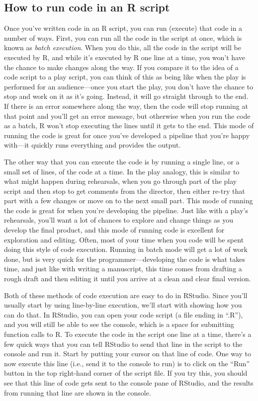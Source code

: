 \documentclass[]{tufte-book}
\begin{document}
\subsection{How to run code in an R script}\label{how-to-run-code-in-an-r-script}

Once you've written code in an R script, you can run (execute) that code in a
number of ways. First, you can run all the code in the script at once, which is
known as \emph{batch execution}. When you do this, all the code in the script will be
executed by R, and while it's executed by R one line at a time, you won't have
the chance to make changes along the way. If you compare it to the idea of a
code script to a play script, you can think of this as being like when the
play is performed for an audience---once you start the play, you don't have
the chance to stop and work on it as it's going. Instead, it will go straight
through to the end. If there is an error somewhere along the way, then the code
will stop running at that point and you'll get an error message, but otherwise
when you run the code as a batch, R won't stop executing the lines until it gets
to the end. This mode of running the code is great for once you've developed a
pipeline that you're happy with---it quickly runs everything and provides the
output.

The other way that you can execute the code is by running a single line, or a
small set of lines, of the code at a time. In the play analogy, this is similar
to what might happen during rehearsals, when you go through part of the play
script and then stop to get comments from the director, then either re-try that
part with a few changes or move on to the next small part. This mode of running
the code is great for when you're developing the pipeline. Just like with a
play's rehearsals, you'll want a lot of chances to explore and change things as
you develop the final product, and this mode of running code is excellent for
exploration and editing. Often, most of your time when you code will be spent
doing this style of code execution. Running in batch mode will get a lot of work
done, but is very quick for the programmer---developing the code is what takes
time, and just like with writing a manuscript, this time comes from drafting a
rough draft and then editing it until you arrive at a clean and clear final
version.

Both of these methods of code execution are easy to do in RStudio. Since you'll
usually start by using line-by-line execution, we'll start with showing how you
can do that. In RStudio, you can open your code script (a file ending in ``.R''),
and you will still be able to see the console, which is a space for submitting
function calls to R. To execute the code in the script one line at a time,
there's a few quick ways that you can tell RStudio to send that line in the
script to the console and run it. Start by putting your cursor on that line of code.
One way to now execute this line (i.e., send it to the console to run) is to
click on the ``Run'' button in the top right-hand corner of the script file. If
you try this, you should see that this line of code gets sent to the console
pane of RStudio, and the results from running that line are shown in the
console.
\end{document}

